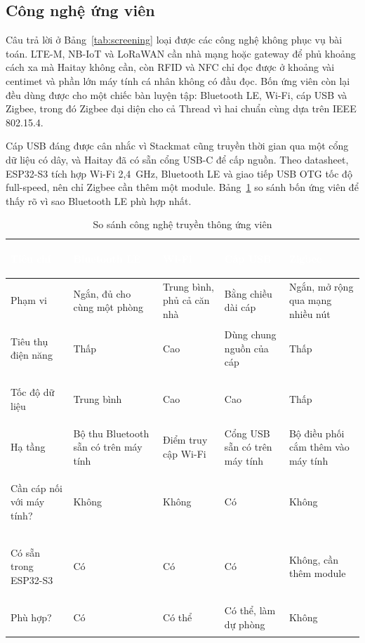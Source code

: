\subsection{Công nghệ ứng viên}
Câu trả lời ở Bảng~\ref{tab:screening} loại được các công nghệ không phục vụ bài toán. LTE-M, NB-IoT và LoRaWAN cần nhà mạng hoặc gateway để phủ khoảng cách xa mà Haitay không cần, còn RFID và NFC chỉ đọc được ở khoảng vài centimet và phần lớn máy tính cá nhân không có đầu đọc. Bốn ứng viên còn lại đều dùng được cho một chiếc bàn luyện tập: Bluetooth LE, Wi-Fi, cáp USB và Zigbee, trong đó Zigbee đại diện cho cả Thread vì hai chuẩn cùng dựa trên IEEE 802.15.4.

Cáp USB đáng được cân nhắc vì Stackmat cũng truyền thời gian qua một cổng dữ liệu có dây, và Haitay đã có sẵn cổng USB-C để cấp nguồn. Theo datasheet, ESP32-S3 tích hợp Wi-Fi 2,4~GHz, Bluetooth LE và giao tiếp USB OTG tốc độ full-speed, nên chỉ Zigbee cần thêm một module. Bảng~\ref{tab:comm} so sánh bốn ứng viên để thấy rõ vì sao Bluetooth LE phù hợp nhất.

\begin{table}[H]
    \centering
    \small
    \renewcommand{\arraystretch}{1.4}
    \caption{So sánh công nghệ truyền thông ứng viên}
    \label{tab:comm}
    \begin{tabular}{>{\bfseries\raggedright\arraybackslash}m{2.4cm} >{\raggedright\arraybackslash}m{2.8cm} >{\raggedright\arraybackslash}m{2.8cm} >{\raggedright\arraybackslash}m{2.8cm} >{\raggedright\arraybackslash}m{2.8cm}}
        \toprule
        \rowcolor{haitayblue}
        \textcolor{white}{Tiêu chí} & \textcolor{white}{Bluetooth LE} & \textcolor{white}{Wi-Fi} & \textcolor{white}{Cáp USB} & \textcolor{white}{Zigbee} \\
        \midrule
        \rowcolor{haitayblue!8}
        Phạm vi & Ngắn, đủ cho cùng một phòng & Trung bình, phủ cả căn nhà & Bằng chiều dài cáp & Ngắn, mở rộng qua mạng nhiều nút \\
        Tiêu thụ điện năng & Thấp & Cao & Dùng chung nguồn của cáp & Thấp \\
        \rowcolor{haitayblue!8}
        Tốc độ dữ liệu & Trung bình & Cao & Cao & Thấp \\
        Hạ tầng & Bộ thu Bluetooth sẵn có trên máy tính & Điểm truy cập Wi-Fi & Cổng USB sẵn có trên máy tính & Bộ điều phối cắm thêm vào máy tính \\
        \rowcolor{haitayblue!8}
        Cần cáp nối với máy tính? & Không & Không & Có & Không \\
        Có sẵn trong ESP32-S3 & Có & Có & Có & Không, cần thêm module \\
        \rowcolor{haitayblue!8}
        Phù hợp? & Có & Có thể & Có thể, làm dự phòng & Không \\
        \bottomrule
    \end{tabular}
\end{table}

